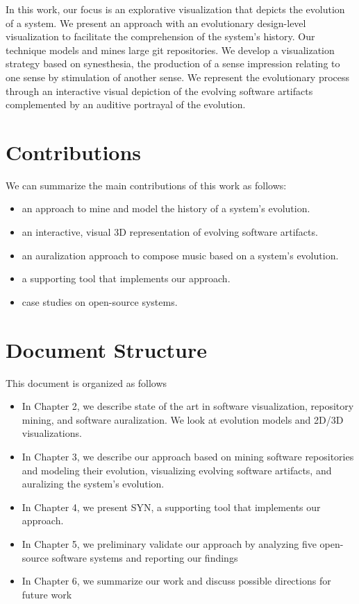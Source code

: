 In this work, our focus is an explorative visualization that depicts the evolution of a system.
We present an approach with an evolutionary design-level visualization to facilitate the comprehension of the system's history. 
Our technique models and mines large git repositories. We develop a visualization strategy based on synesthesia, the production of a sense impression relating to one sense by stimulation of another sense. We represent the evolutionary process through an interactive visual depiction of the evolving software artifacts complemented by an auditive portrayal of the evolution. 

\section{Contributions}
We can summarize the main contributions of this work as follows:
\begin{itemize}
 \item an approach to mine and model the history of a system's evolution.
 \item an interactive, visual 3D representation of evolving software artifacts.
 \item an auralization approach to compose music based on a system's evolution.
 \item a supporting tool that implements our approach.
 \item case studies on open-source systems.
\end{itemize}


\section{Document Structure}
This document is organized as follows
\begin{itemize}
 \item In Chapter 2, we describe state of the art in software visualization, repository mining, and software auralization. We look at evolution models and 2D/3D visualizations. 
 \item In Chapter 3, we describe our approach based on mining software repositories and modeling their evolution, visualizing evolving software artifacts, and auralizing the system's evolution. 
 \item In Chapter 4, we present SYN, a supporting tool that implements our approach. 
 \item In Chapter 5, we preliminary validate our approach by analyzing five open-source software systems and reporting our findings
 \item In Chapter 6, we summarize our work and discuss possible directions for future work \end{itemize}